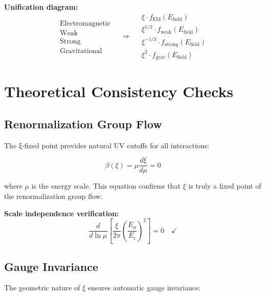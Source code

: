 \documentclass[12pt,a4paper]{report}
\begin{document}
\textbf{Unification diagram:}
\begin{equation}
	\begin{array}{c}
		\text{Electromagnetic} \\
		\text{Weak} \\
		\text{Strong} \\
		\text{Gravitational}
	\end{array} \quad \Rightarrow \quad
	\begin{array}{c}
		\xi \cdot f_{\text{EM}}(E_{\text{field}}) \\
		\xi^{1/2} \cdot f_{\text{weak}}(E_{\text{field}}) \\
		\xi^{-1/3} \cdot f_{\text{strong}}(E_{\text{field}}) \\
		\xi^2 \cdot f_{\text{grav}}(E_{\text{field}})
	\end{array}
\end{equation}

\section{Theoretical Consistency Checks}
\label{sec:consistency_checks}

\subsection{Renormalization Group Flow}
\label{subsec:renormalization_flow}

The ξ-fixed point provides natural UV cutoffs for all interactions:

\begin{equation}
	\beta(\xi) = \mu \frac{d\xi}{d\mu} = 0
\end{equation}

where $\mu$ is the energy scale. This equation confirms that $\xi$ is truly a fixed point of the renormalization group flow.

\textbf{Scale independence verification:}
\begin{equation}
	\frac{d}{d\ln\mu}\left[\frac{\xi}{2\pi}\left(\frac{E_\mu}{E_e}\right)^2\right] = 0 \quad \checkmark
\end{equation}

\subsection{Gauge Invariance}
\label{subsec:gauge_invariance}

The geometric nature of $\xi$ ensures automatic gauge invariance:
\end{document}
